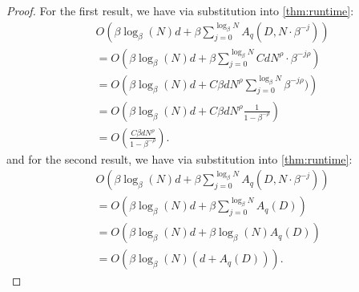 \documentclass{article}
\theoremstyle{plain}
\theoremstyle{definition}
\theoremstyle{remark}
\newcommand{\julian}[1]{{\color{red}{\bf Julian:} #1}}
\newcommand{\josh}[1]{{\color{orange}{\bf Josh:} #1}}
\begin{document}
 
\commonfuncclasses*
 \begin{proof}
 For the first result, we have via substitution into \cref{thm:runtime}:
\begin{align*}
    &O\left(\beta\log_\beta(N)d + \beta\sum_{j=0}^{\log_\beta{N}} A_q(D, N \cdot \beta^{-j})\right)\\
    &= O\left(\beta\log_\beta(N)d + \beta\sum_{j=0}^{\log_\beta{N}} CdN^\rho \cdot \beta^{-j \rho}\right)\\
        &= O\left(\beta\log_\beta(N)d + C\beta dN^\rho\sum_{j=0}^{\log_\beta{N}} \beta^{-j \rho})\right)\\
        &= O\left(\beta\log_\beta(N)d + C\beta dN^\rho \frac{1}{1 - \beta^{-\rho}}\right)\\
        &= O\left(\frac{C\beta dN^\rho}{1 - \beta^{-\rho}}\right).
\end{align*}
and for the second result, we have via substitution into \cref{thm:runtime}: 
\begin{align*}
    &O\left(\beta\log_\beta(N)d + \beta\sum_{j=0}^{\log_\beta{N}} A_q(D, N \cdot \beta^{-j})\right)\\
    &= O\left(\beta\log_\beta(N)d + \beta\sum_{j=0}^{\log_\beta{N}} A_q(D)\right)\\
        &= O\left(\beta\log_\beta(N)d + \beta\log_\beta(N)A_q(D)\right)\\
        &= O\left(\beta\log_\beta(N)(d + A_q(D))\right).
\end{align*}
\end{proof}
\end{document}
